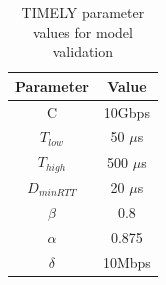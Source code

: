 \begin{table}[t]
\small
\center
\begin{tabular}{c|c}
Parameter & Value \\ \hline
C & 10Gbps \\ 
$T_{low}$ & 50 $\mu$s \\ 
$T_{high}$ & 500 $\mu$s \\
$D_{minRTT}$ & 20 $\mu$s \\
$\beta$ & 0.8 \\
$\alpha$ & 0.875 \\
$\delta$ & 10Mbps
\end{tabular}
\caption{TIMELY parameter values for model validation}
\label{tab:timely_model_validation}
\end{table}

\begin{figure}[t]
\center
{}
\end{figure}
